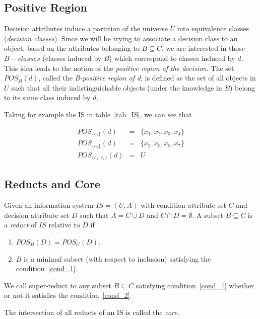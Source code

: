 \documentclass[citenumber]{llncs}
\begin{document}
\subsection{Positive Region}\label{subsect_Pos}
  Decision attributes induce a partition of the universe $U$ into equivalence classes 
  (\textit{decision classes}). Since we will be trying to associate a decision class to an object, 
  based on the attributes belonging to $B \subseteq C$, we are interested in those 
  $B-classes$ (classes induced by $B$) which correspond to classes induced by $d$. 
  This idea leads to the notion of the  \textit{positive region of the decision}. The set $POS_B(d)$, 
  called the \textit{B-positive region of d}, is defined as the set of all objects in $U$ such 
  that all their indistinguishable objects (under the knowledge in $B$) belong to its same class induced 
  by $d$.
  
  Taking for example the IS in table~\ref{tab_IS}, we can see that
  
  $$\begin{array}{lcc}
  POS_{\lbrace c_1 \rbrace}(d)     &=& \lbrace x_1,x_2,x_3,x_4 \rbrace\\
  POS_{\lbrace c_2 \rbrace}(d)     &=& \lbrace x_2,x_3,x_5,x_7 \rbrace\\
  POS_{\lbrace c_1, c_2 \rbrace}(d)&=& U
  \end{array}$$
 
\subsection{Reducts and Core}\label{def_reduct}
  Given an information system $IS=(U,A)$ with condition attribute set $C$ and decision attribute set
  $D$ such that $A=C \cup D$ and $C \cap D =\emptyset$. A subset $B \subseteq C$ is a \textit{reduct} 
  of $IS$ relative to $D$ if
  \begin{enumerate}
  	\item $POS_B(D)=POS_C(D)$. \label{cond_1}
  	\item $B$ is a minimal subset (with respect to inclusion) satisfying the condition~\ref{cond_1}.\label{cond_2}
  \end{enumerate}

  We call super-reduct to any subset $B \subseteq C$ satisfying condition~\ref{cond_1} whether  or not it satisfies the condition~\ref{cond_2}.
  
  The intersection of all reducts of an IS is called the \textit{core}.
  
\end{document}
